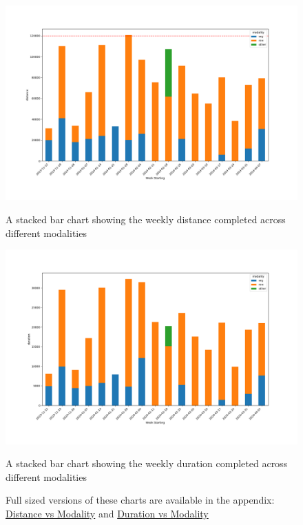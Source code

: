 \begin{figure}[htbp]
  \centering
  \begin{minipage}[c]{0.45\textwidth}
    \centering
    \includegraphics[width=\linewidth]{figures/distanceVsMod.png}
    \captionsetup{justification=centering}
    \caption[Distance vs Modality]{\label{fig:distanceVsMod}A stacked bar chart showing the weekly distance completed across different modalities}
  \end{minipage}
  \begin{minipage}[c]{0.45\textwidth}
    \centering
    \includegraphics[width=\linewidth]{figures/durationVsMod.png}
    \captionsetup{justification=centering}
    \caption[Duration vs Modality]{\label{fig:durationVsMod}A stacked bar chart showing the weekly duration completed across different modalities}
  \end{minipage}
  \captionsetup{justification=centering,width=0.7\linewidth}
  \caption*{Full sized versions of these charts are available in the appendix: \hyperref[fig:app_distanceVsMod]{Distance vs Modality} and \hyperref[fig:app_durationVsMod]{Duration vs Modality}}
\end{figure}

